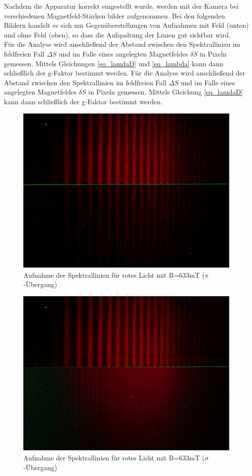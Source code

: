 Nachdem die Apparatur korrekt eingestellt wurde, werden mit der Kamera bei verschiedenen Magnetfeld-Stärken bilder aufgenommen. Bei den folgenden Bildern handelt es sich um Gegenüberstellungen von Aufnahmen mit Feld (unten) und ohne Feld (oben), so dass die Aufspaltung der Linien gut sichtbar wird.\\
Für die Analyse wird anschließend der Abstand zwischen den Spektrallinien im feldfreien Fall $\Delta S$ und im Falle eines angelegten Magnetfeldes $\delta S$ in Pixeln gemessen. Mittels Gleichungen \eqref{eq_lamdaD} und \eqref{eq_lambda} kann dann schließlich der g-Faktor bestimmt werden.
Für die Analyse wird anschließend der Abstand zwischen den Spektrallinien im feldfreien Fall $\Delta S$ und im Falle eines angelegten Magnetfeldes $\delta S$ in Pixeln gemessen. Mittels Gleichung \eqref{eq_lamdaD} kann dann schließlich der g-Faktor bestimmt werden.
\newpage
\begin{figure}[htbp]
\includegraphics[scale=.5]{../pics/red1.pdf}
\caption{Aufnahme der Spektrallinien für rotes Licht mit B=633mT ($\pi$-Übergang)}
\label{pic_red1}
\end{figure}
\begin{figure}[htbp]
\includegraphics[scale=.5]{../pics/red2.pdf}
\caption{Aufnahme der Spektrallinien für rotes Licht mit B=633mT ($\sigma$-Übergang)}
\label{pic_red2}
\end{figure}
